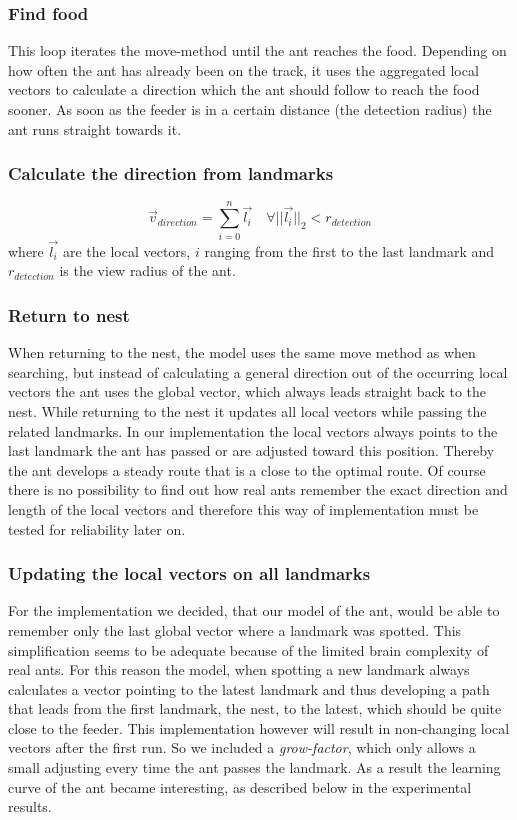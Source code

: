 \documentclass[11pt]{article}
\begin{document}
\subsubsection{Find food} This loop iterates the move-method until the ant reaches the food. Depending on how often the ant has already been on the track, it uses the aggregated local vectors to calculate a direction which the ant should follow to reach the food sooner. As soon as the feeder is in a certain distance (the detection radius) the ant runs straight towards it.

\subsubsection{Calculate the direction from landmarks}
\begin{equation}
	\vec{v}_{direction} = \sum_{i=0}^{n}\vec{l_i} \quad \forall ||\vec{l_i}||_2 < r_{detection}
\end{equation}
where $\vec{l_i}$ are the local vectors, $i$ ranging from the first to the last landmark and $r_{detection}$ is the view radius of the ant.

\subsubsection{Return to nest}
When returning to the nest, the model uses the same move method as when 	searching, but instead of calculating a general direction out of the occurring local vectors the ant uses the global vector, which always leads straight back to the nest. While returning to the nest it updates all local vectors while passing the related landmarks. In our implementation the local vectors always points to the last landmark the ant has passed or are adjusted toward this position. Thereby the ant develops a steady route that is a close to the optimal route. Of course there is no possibility to find out how real ants remember the exact direction and length of the local vectors and therefore this way of implementation must be tested for reliability later on.

\subsubsection{Updating the local vectors on all landmarks}

For the implementation we decided, that our model of the ant, would be able to remember only the last global vector where a landmark was spotted. This simplification seems to be adequate because of the limited brain complexity of real ants. For this reason the model, when spotting a new landmark always calculates a vector pointing to the latest landmark and thus developing a path that leads from the first landmark, the nest, to the latest, which should be quite close to the feeder. This implementation however will result in non-changing local vectors after the first run. So we included a \textit{grow-factor}, which only allows a small adjusting every time the ant passes the landmark. As a result the learning curve of the ant became interesting, as described below in the experimental results.
\end{document}
